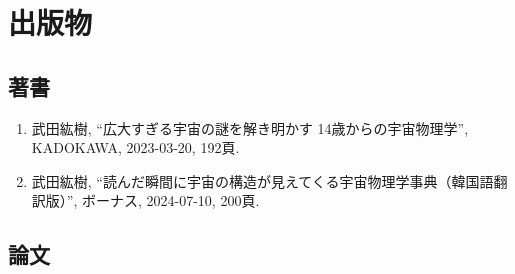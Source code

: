 \documentclass[uplatex, 11pt]{jsarticle}
\begin{document}

\section*{出版物}
\subsection*{著書}
\begin{enumerate}
\item 武田紘樹, “広大すぎる宇宙の謎を解き明かす 14歳からの宇宙物理学”, KADOKAWA, 2023-03-20, 192頁.
\item 武田紘樹, “読んだ瞬間に宇宙の構造が見えてくる宇宙物理学事典（韓国語翻訳版）”, ボーナス, 2024-07-10, 200頁.
\end{enumerate}
\subsection*{論文}
\end{document}

